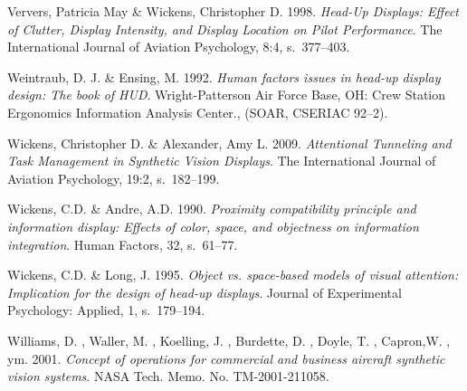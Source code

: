 \documentclass[utf8,bachelor,manualbib]{gradu3}
\begin{document}
\begin{thebibliography}{}
Ververs, Patricia May \& Wickens, Christopher D. 1998.
\textit{Head-Up Displays: Effect of Clutter, Display Intensity, and Display Location on Pilot Performance}.
The International Journal of Aviation Psychology, 8:4, s.~377--403.

Weintraub, D. J. \& Ensing, M. 1992.
\textit{Human factors issues in head-up display design: The book of
HUD}.
Wright-Patterson Air Force Base, OH: Crew Station Ergonomics
Information Analysis Center., (SOAR, CSERIAC 92–2).

Wickens, Christopher D. \& Alexander, Amy L. 2009.
\textit{Attentional Tunneling and Task Management in Synthetic Vision Displays}.
The International Journal of Aviation Psychology, 19:2, s.~182--199.

Wickens, C.D. \& Andre, A.D. 1990.
\textit{Proximity compatibility principle and information display: Effects
of color, space, and objectness on information integration}.
Human Factors, 32, s.~61--77.

Wickens, C.D. \& Long, J. 1995.
\textit{Object vs. space-based models of visual attention: Implication for the design of head-up displays}.
Journal of Experimental Psychology: Applied, 1, s.~179--194.

Williams, D. , Waller, M. , Koelling, J. , Burdette, D. , Doyle, T. , Capron,W. , ym. 2001.
\textit{Concept of operations for commercial and business aircraft synthetic vision systems}.
NASA Tech. Memo. No. TM-2001-211058.

\end{thebibliography}
\end{document}
